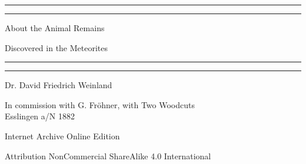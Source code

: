 \documentclass[a4paper, 12pt, oneside]{article}
\begin{document}
\begin{titlepage} %
	\centering %
	\scshape %

	
	\rule{\textwidth}{1.6pt}\vspace*{-\baselineskip}\vspace*{2pt} %
	\rule{\textwidth}{0.4pt} %
	
	\vspace{1.5\baselineskip} %
	
	{\LARGE About the Animal Remains}
	
	\vspace{1.2\baselineskip}
	
	{\LARGE Discovered in the Meteorites}
	
	\vspace{1\baselineskip} %

	\rule{\textwidth}{0.4pt}\vspace*{-\baselineskip}\vspace{3.2pt} %
	\rule{\textwidth}{1.6pt} %
	
	\vspace{1\baselineskip} %
	
	
	{Dr. David Friedrich Weinland} %
	
	\vspace*{1\baselineskip} %
	
    {\small In commission with G. Fröhner, with Two Woodcuts\\ Esslingen a/N 1882} %
    
    \vspace*{\fill}

	{\small\scshape }

    Internet Archive Online Edition  %
	
	{\small Attribution NonCommercial ShareAlike 4.0 International } %
\end{titlepage}
\setlength{\parskip}{1mm plus1mm minus1mm}
\clearpage
\tableofcontents
\clearpage
\end{document}
